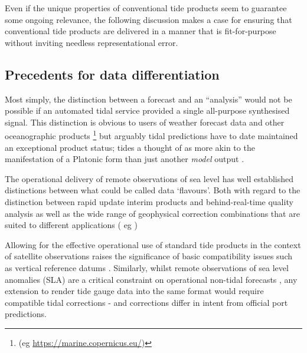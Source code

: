Even if the unique properties of conventional tide products seem to guarantee some ongoing relevance, the following discussion makes a case for ensuring that conventional tide products are delivered in a manner that is fit-for-purpose without inviting needless representational error. 


\subsection{Precedents for data differentiation}

Most simply, the distinction between a forecast and an ``analysis'' would not be possible if an automated tidal service provided a single all-purpose synthesised signal.
This distinction is obvious to users of weather forecast data and other oceanographic products \footnote{(eg \url{https://marine.copernicus.eu/})} but arguably tidal predictions have to date maintained an exceptional product status; tides a thought of as more akin to the manifestation of a Platonic form than just another \textit{model} output \citep{Jay:2003bj} \citep{10.1029/2018rg000636}.


The operational delivery of remote  observations of sea level has well established distinctions between what could be called data `flavours'.   Both with regard to the distinction between rapid update interim products and behind-real-time quality analysis as well as the wide range of geophysical  correction combinations that are suited to different applications ( eg \citep{Scharroo:2014vv} )


Allowing for the effective operational use of standard tide products in the context of satellite observations raises the significance of basic compatibility 
issues such as vertical reference datums \citep{10.3389/fmars.2020.549467}.
Similarly, whilst remote observations of sea level anomalies (SLA) are a critical constraint on operational non-tidal forecasts \citep{10.1080/1755876x.2019.1685834}, any extension to render tide gauge data into the same format would require compatible tidal corrections - and corrections differ in intent from official port predictions.


